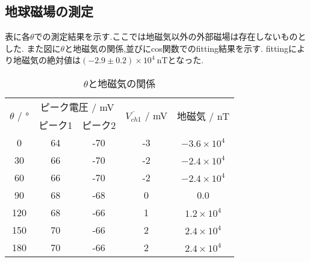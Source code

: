 \subsection{地球磁場の測定}
表に各$\theta$での測定結果を示す.ここでは地磁気以外の外部磁場は存在しないものとした.
また図に$\theta$と地磁気の関係,並びにcos関数でのfitting結果を示す.
fittingにより地磁気の絶対値は$(-2.9\pm0.2)\times10^4\ \si{\nano\tesla}$となった.
\begin{table}[h]
\caption{$\theta$と地磁気の関係}
\label{tab:tijiki}
\centering
\begin{tabular}{ccccc}
\hline
\multirow{2}{*}{$\theta$ / $\si{\degree}$}&\multicolumn{2}{c}{ピーク電圧 / mV}&\multirow{2}{*}{$\overline{V_{ch1}}$ / mV}&\multirow{2}{*}{地磁気 / nT}\\
&ピーク1&ピーク2\\
\hline \hline
0 & 64 & -70 & -3 & $-3.6\times10^4$ \\
30 & 66 & -70 & -2 & $-2.4\times10^4$ \\
60 & 66 & -70 & -2 & $-2.4\times10^4$ \\
90 & 68 & -68 & 0 & 0.0 \\
120 & 68 & -66 & 1 & $1.2\times10^4$ \\
150 & 70 & -66 & 2 & $2.4\times10^4$ \\
180 & 70 & -66 & 2 & $2.4\times10^4$ \\
\hline
\end{tabular}
\end{table}

